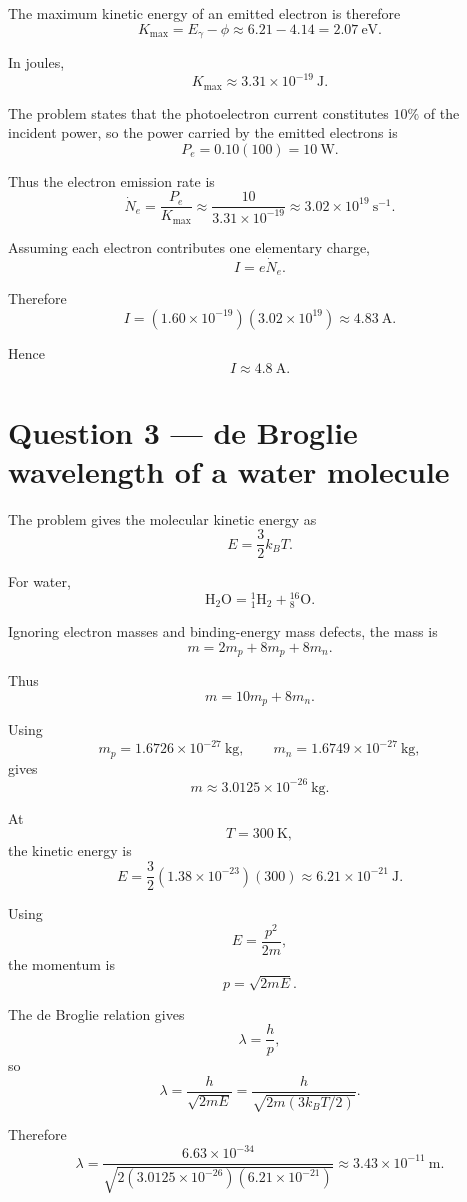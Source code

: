\documentclass[11pt,a4paper]{article}
\begin{document}
The maximum kinetic energy of an emitted electron is therefore
\[
K_{\max}
=
E_\gamma-\phi
\approx6.21-4.14
=2.07\ \mathrm{eV}.
\]

In joules,
\[
K_{\max}\approx3.31\times10^{-19}\ \mathrm J.
\]

The problem states that the photoelectron current constitutes $10\%$ of the
incident power, so the power carried by the emitted electrons is
\[
P_e=0.10(100)=10\ \mathrm W.
\]

Thus the electron emission rate is
\[
\dot N_e=\frac{P_e}{K_{\max}}
\approx
\frac{10}{3.31\times10^{-19}}
\approx3.02\times10^{19}\ \mathrm{s^{-1}}.
\]

Assuming each electron contributes one elementary charge,
\[
I=e\dot N_e.
\]

Therefore
\[
I
=
(1.60\times10^{-19})(3.02\times10^{19})
\approx4.83\ \mathrm A.
\]

Hence
\[
\boxed{I\approx4.8\ \mathrm A}.
\]

\section{Question 3 --- de Broglie wavelength of a water molecule}

The problem gives the molecular kinetic energy as
\[
E=\frac32 k_BT.
\]

For water,
\[
\mathrm{H_2O}
=
{}^1_1\mathrm H_2+{}^{16}_8\mathrm O.
\]

Ignoring electron masses and binding-energy mass defects, the mass is
\[
m
=
2m_p+8m_p+8m_n.
\]

Thus
\[
m
=
10m_p+8m_n.
\]

Using
\[
m_p=1.6726\times10^{-27}\ \mathrm{kg},
\qquad
m_n=1.6749\times10^{-27}\ \mathrm{kg},
\]
gives
\[
m\approx3.0125\times10^{-26}\ \mathrm{kg}.
\]

At
\[
T=300\ \mathrm K,
\]
the kinetic energy is
\[
E
=
\frac32(1.38\times10^{-23})(300)
\approx6.21\times10^{-21}\ \mathrm J.
\]

Using
\[
E=\frac{p^2}{2m},
\]
the momentum is
\[
p=\sqrt{2mE}.
\]

The de Broglie relation gives
\[
\lambda=\frac hp,
\]
so
\[
\lambda
=
\frac{h}{\sqrt{2mE}}
=
\frac{h}
{\sqrt{2m(3k_BT/2)}}.
\]

Therefore
\[
\lambda
=
\frac{6.63\times10^{-34}}
{\sqrt{
2(3.0125\times10^{-26})
(6.21\times10^{-21})
}}
\approx3.43\times10^{-11}\ \mathrm m.
\]
\end{document}
